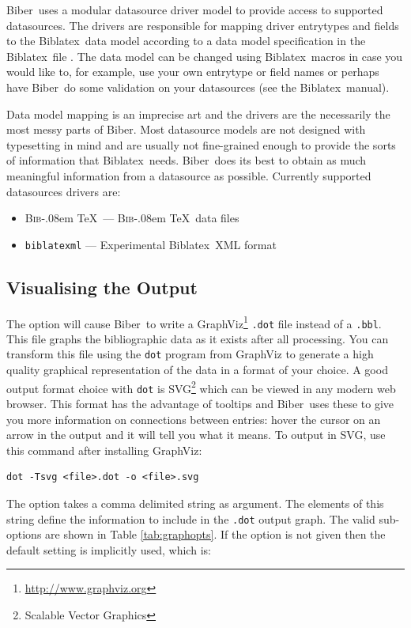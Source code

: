 \documentclass{ltxdockit}
\def\BibTeX{\textsc{Bib}\kern-.08em \TeX}
\newcommand*{\biber}{Biber\xspace}
\newcommand*{\biblatex}{Biblatex\xspace}
\begin{document}
\biber\ uses a modular datasource driver model to provide access
to supported datasources. The drivers are responsible for mapping
driver entrytypes and fields to the \biblatex\ data model according to a
data model specification in the \biblatex\ file . The
data model can be changed using \biblatex\ macros in case you would
like to, for example, use your own entrytype or field names or perhaps
have \biber\ do some validation on your datasources (see the \biblatex\
manual). 

Data model mapping is an imprecise art and the drivers are the
necessarily the most messy parts of \biber. Most datasource models are
not designed with typesetting in mind and are usually not fine-grained
enough to provide the sorts of information that \biblatex\
needs. \biber\ does its best to obtain as much meaningful information
from a datasource as possible. Currently supported datasources
drivers are:

\begin{itemize}
\item \BibTeX\ --- \BibTeX\ data files
\item \verb+biblatexml+ --- Experimental \biblatex\ XML format
\end{itemize}

\subsection{Visualising the Output}\label{ref:vis}

The option  will cause \biber\ to write a
GraphViz\footnote{\url{http://www.graphviz.org}} \verb+.dot+ file instead
of a \verb+.bbl+. This file graphs the bibliographic data as it exists
after all processing. You can transform this file using the \verb+dot+
program from GraphViz to generate a high quality graphical representation
of the data in a format of your choice. A good output format choice with
\verb+dot+ is SVG\footnote{Scalable Vector Graphics} which can be viewed in
any modern web browser. This format has the advantage of tooltips and \biber\
uses these to give you more information on connections between entries:
hover the cursor on an arrow in the output and it will tell you what it
means. To output in SVG, use this command after installing GraphViz:

\begin{verbatim}
dot -Tsvg <file>.dot -o <file>.svg
\end{verbatim}

\noindent The  option takes a comma delimited string as
argument. The elements of this string define the information to include in
the \verb+.dot+ output graph. The valid sub-options are shown in Table
\ref{tab:graphopts}. If the \opt{--dot-include} option is not given
then the default setting is implicitly used, which is:
\end{document}
